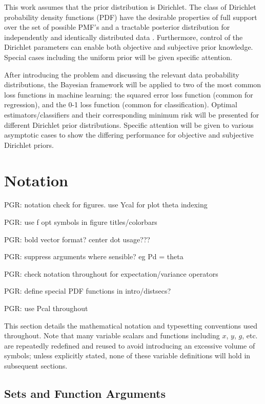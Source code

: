 \documentclass[12pt]{report}
\begin{document}
This work assumes that the prior distribution is Dirichlet. The class of Dirichlet probability density functions (PDF) have the desirable properties of full support over the set of possible PMF's and a tractable posterior distribution for independently and identically distributed data \cite{ferguson}. Furthermore, control of the Dirichlet parameters can enable both objective and subjective prior knowledge. Special cases including the uniform prior will be given specific attention.

After introducing the problem and discussing the relevant data probability distributions, the Bayesian framework will be applied to two of the most common loss functions in machine learning: the squared error loss function (common for regression), and the 0-1 loss function (common for classification). Optimal estimators/classifiers and their corresponding minimum risk will be presented for different Dirichlet prior distributions. Specific attention will be given to various asymptotic cases to show the differing performance for objective and subjective Dirichlet priors.




\section{Notation}

PGR: notation check for figures. use Ycal for plot theta indexing

PGR: use f opt symbols in figure titles/colorbars

PGR: bold vector format? center dot usage???

PGR: suppress arguments where sensible? eg Pd = theta

PGR: check notation throughout for expectation/variance operators

PGR: define special PDF functions in intro/distsecs?

PGR: use Pcal throughout


This section details the mathematical notation and typesetting conventions used throughout. Note that many variable scalars and functions including $x$, $y$, $g$, etc. are repeatedly redefined and reused to avoid introducing an excessive volume of symbols; unless explicitly stated, none of these variable definitions will hold in subsequent sections.



\subsection*{Sets and Function Arguments}
\end{document}
